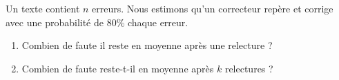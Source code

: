 
\begin{exercice}\label{exosmath-0024}

    Un texte contient \( n\) erreurs. Nous estimons qu'un correcteur repère et corrige avec une probabilité de \( 80\%\) chaque erreur.
    \begin{enumerate}
        \item
            Combien de faute il reste en moyenne après une relecture ?
        \item
            Combien de faute reste-t-il en moyenne après \( k\) relectures ?
    \end{enumerate}

\end{exercice}
